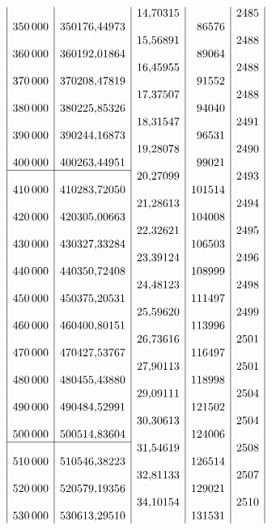 {\[\begin{array}{|r|r|r|r|r|}
&&14{,}70315&&2485\\
350\,000&350176{,}44973&&86576&\\
&&15{,}56891&&2488\\
360\,000&360192{,}01864&&89064&\\
&&16{,}45955&&2488\\
370\,000&370208{,}47819&&91552&\\
&&17{,}37507&&2488\\
380\,000&380225{,}85326&&94040&\\
&&18{,}31547&&2491\\
390\,000&390244{,}16873&&96531&\\
&&19{,}28078&&2490\\
400\,000&400263{,}44951&&99021&\\
\cline{1-2}
&&20{,}27099&&2493\\
410\,000&410283{,}72050&&101514&\\
&&21{,}28613&&2494\\
420\,000&420305{,}00663&&104008&\\
&&22{,}32621&&2495\\
430\,000&430327{,}33284&&106503&\\
&&23{,}39124&&2496\\
440\,000&440350{,}72408&&108999&\\
&&24{,}48123&&2498\\
450\,000&450375{,}20531&&111497&\\
&&25{,}59620&&2499\\
460\,000&460400{,}80151&&113996&\\
&&26{,}73616&&2501\\
470\,000&470427{,}53767&&116497&\\
&&27{,}90113&&2501\\
480\,000&480455{,}43880&&118998&\\
&&29{,}09111&&2504\\
490\,000&490484{,}52991&&121502&\\
&&30{,}30613&&2504\\
500\,000&500514{,}83604&&124006&\\
\cline{1-2}
&&31{,}54619&&2508\\
510\,000&510546{,}38223&&126514&\\
&&32{,}81133&&2507\\
520\,000&520579{,}19356&&129021&\\
&&34{,}10154&&2510\\
530\,000&530613{,}29510&&131531&\\

\end{array}\]}
